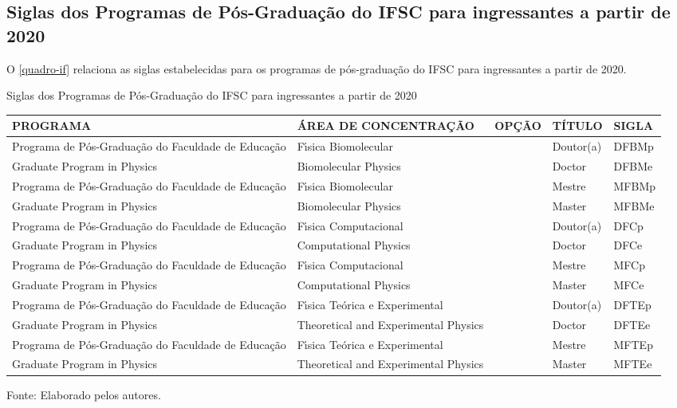 \begin{apendicesenv}
\chapter{Siglas dos Programas de P\'os-Gradua\c{c}\~ao do IFSC para ingressantes a partir de 2020}
O \autoref{quadro-if} relaciona as siglas estabelecidas para os programas de p\'os-gradua\c{c}\~ao do IFSC para ingressantes a partir de 2020.
\begin{quadro}[Htb] 
	\ABNTEXfontereduzida
	\caption[Siglas dos Programas de P\'os-Gradua\c{c}\~ao do IFSC para ingressantes a partir de 2020]{Siglas dos Programas de P\'os-Gradua\c{c}\~ao do IFSC para ingressantes a partir de 2020}
	\label{quadro-if}
	\begin{tabular}{|p{4.5cm}|p{4.0cm}|p{2.0cm}|p{1.5cm}|p{2.25cm}|}
		\hline
		\textbf{PROGRAMA} & \textbf{\'AREA DE CONCENTRA\c{C}\~AO} & \textbf{OP\c{C}\~AO} & \textbf{T\'ITULO} & \textbf{SIGLA}  \\
		\hline
		Programa de P\'os-Gradua\c{c}\~ao do Faculdade de Educa\c{c}\~ao& F\'{\i}sica Biomolecular &  & Doutor(a) & DFBMp\\
		Graduate Program in Physics & Biomolecular Physics &  & Doctor & DFBMe\\
		Programa de P\'os-Gradua\c{c}\~ao do Faculdade de Educa\c{c}\~ao& F\'{\i}sica Biomolecular &  & Mestre & MFBMp\\		
		Graduate Program in Physics & Biomolecular Physics &  & Master & MFBMe\\
		Programa de P\'os-Gradua\c{c}\~ao do Faculdade de Educa\c{c}\~ao& F\'{\i}sica Computacional &  & Doutor(a) & DFCp\\
		Graduate Program in Physics & Computational Physics &  & Doctor & DFCe\\
		Programa de P\'os-Gradua\c{c}\~ao do Faculdade de Educa\c{c}\~ao& F\'{\i}sica Computacional &  & Mestre & MFCp\\		
		Graduate Program in Physics & Computational Physics &  & Master & MFCe\\
		Programa de P\'os-Gradua\c{c}\~ao do Faculdade de Educa\c{c}\~ao& F\'{\i}sica Te\'orica e Experimental &  & Doutor(a) & DFTEp\\		
		Graduate Program in Physics & Theoretical and Experimental Physics &  & Doctor & DFTEe\\
		Programa de P\'os-Gradua\c{c}\~ao do Faculdade de Educa\c{c}\~ao& F\'{\i}sica Te\'orica e Experimental &  & Mestre & MFTEp\\
		Graduate Program in Physics & Theoretical and Experimental Physics &  & Master & MFTEe\\
		\hline
	\end{tabular}
	\begin{flushleft}
		Fonte: Elaborado pelos autores.\
	\end{flushleft}
\end{quadro}


\end{apendicesenv}
